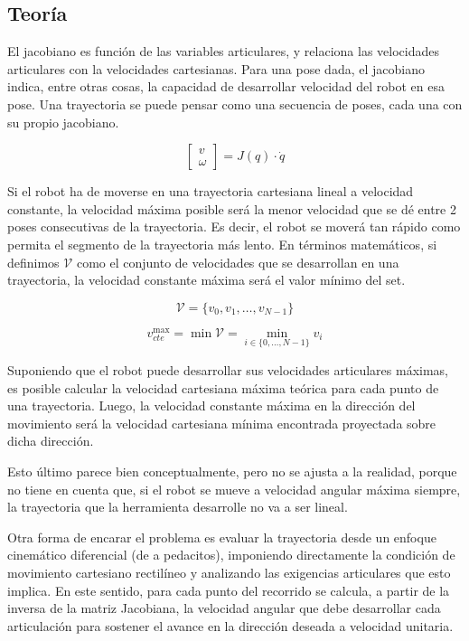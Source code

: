 \clearpage
\subsection{Teoría}

El jacobiano es función de las variables articulares, y relaciona las velocidades articulares con la velocidades cartesianas. Para una pose dada, el jacobiano indica, entre otras cosas, la capacidad de desarrollar velocidad del robot en esa pose. Una trayectoria se puede pensar como una secuencia de poses, cada una con su propio jacobiano.

\begin{equation}
\begin{bmatrix}
	v \\
	\omega
\end{bmatrix}
=
J(q)\cdot \dot{q}
\end{equation}

Si el robot ha de moverse en una trayectoria cartesiana lineal a velocidad constante, la velocidad máxima posible será la menor velocidad que se dé entre 2 poses consecutivas de la trayectoria. Es decir, el robot se moverá tan rápido como permita el segmento de la trayectoria más lento. En términos matemáticos, si definimos $\mathcal{V}$ como el conjunto de velocidades que se desarrollan en una trayectoria, la velocidad constante máxima será el valor mínimo del set.

\begin{equation}
	\mathcal{V} = \{ v_0, v_1, \dots, v_{N-1} \}
\end{equation}

\begin{equation}
	v_{cte}^{\max} =\min \mathcal{V} = \min_{i \in \{0,\dots,N-1\}} v_i
\end{equation}

Suponiendo que el robot puede desarrollar sus velocidades articulares máximas, es posible calcular la velocidad cartesiana máxima teórica para cada punto de una trayectoria. Luego, la velocidad constante máxima en la dirección del movimiento será la velocidad cartesiana mínima encontrada proyectada sobre dicha dirección.

Esto último parece bien conceptualmente, pero no se ajusta a la realidad, porque no tiene en cuenta que, si el robot se mueve a velocidad angular máxima siempre, la trayectoria que la herramienta desarrolle no va a ser lineal.

Otra forma de encarar el problema es evaluar la trayectoria desde un enfoque cinemático diferencial (de a pedacitos), imponiendo directamente la condición de movimiento cartesiano rectilíneo y analizando las exigencias articulares que esto implica. En este sentido, para cada punto del recorrido se calcula, a partir de la inversa de la matriz Jacobiana, la velocidad angular que debe desarrollar cada articulación para sostener el avance en la dirección deseada a velocidad unitaria.

